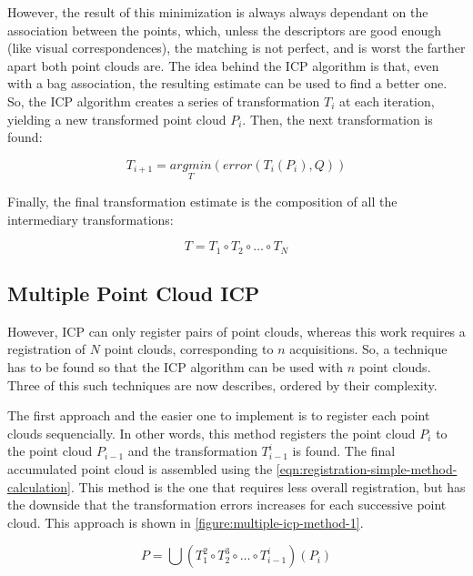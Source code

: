 However, the result of this minimization is always always dependant on the association between the points, which, unless the descriptors are good enough (like visual correspondences), the matching is not perfect, and is worst the farther apart both point clouds are. The idea behind the ICP algorithm is that, even with a bag association, the resulting estimate can be used to find a better one. So, the ICP algorithm creates a series of transformation $T_i$ at each iteration, yielding a new transformed point cloud $P_i$. Then, the next transformation is found:

\begin{equation}
    T_{i+1} = \underset{T}{argmin}(error(T_i(P_i), Q))
\end{equation}

Finally, the final transformation estimate is the composition of all the intermediary transformations:

\begin{equation}
    T = T_1 \circ T_2 \circ \dots \circ T_N
\end{equation}

\subsection{Multiple Point Cloud ICP}
\label{section:multiple-pointcloud-icp}

However, ICP can only register pairs of point clouds, whereas this work requires a registration of $N$ point clouds, corresponding to $n$ acquisitions. So, a technique has to be found so that the ICP algorithm can be used with $n$ point clouds. Three of this such techniques are now describes, ordered by their complexity.

The first approach and the easier one to implement is to register each point clouds sequencially. In other words, this method registers the point cloud $P_i$ to the point cloud $P_{i-1}$ and the transformation $T_{i-1}^{i}$ is found. The final accumulated point cloud is assembled using the \cref{eqn:registration-simple-method-calculation}. This method is the one that requires less overall registration, but has the downside that the transformation errors increases for each successive point cloud. This approach is shown in \cref{figure:multiple-icp-method-1}.

\begin{equation}
\label{eqn:registration-simple-method-calculation}
    P = \bigcup{\left(T_1^2 \circ T_2^3 \circ \dots \circ T_{i-1}^i\right)(P_i)}
\end{equation}

